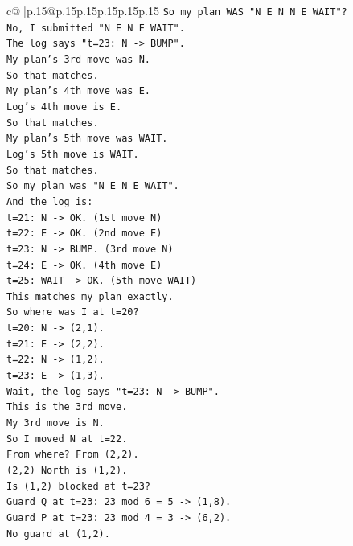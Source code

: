 \documentclass{article}
\begin{document}
{\begin{supertabular}{c@{$\;$}|p{.15\linewidth}@{}p{.15\linewidth}p{.15\linewidth}p{.15\linewidth}p{.15\linewidth}p{.15\linewidth}}
{{{\texttt{So my plan WAS "N E N N E WAIT"?} \\
\texttt{No, I submitted "N E N E WAIT".} \\
\texttt{The log says "t=23: N {-}> BUMP".} \\
\texttt{My plan's 3rd move was N.} \\
\texttt{So that matches.} \\
\texttt{My plan's 4th move was E.} \\
\texttt{Log's 4th move is E.} \\
\texttt{So that matches.} \\
\texttt{My plan's 5th move was WAIT.} \\
\texttt{Log's 5th move is WAIT.} \\
\texttt{So that matches.} \\
\texttt{So my plan was "N E N E WAIT".} \\
\texttt{And the log is:} \\
\texttt{t=21: N {-}> OK. (1st move N)} \\
\texttt{t=22: E {-}> OK. (2nd move E)} \\
\texttt{t=23: N {-}> BUMP. (3rd move N)} \\
\texttt{t=24: E {-}> OK. (4th move E)} \\
\texttt{t=25: WAIT {-}> OK. (5th move WAIT)} \\
\texttt{This matches my plan exactly.} \\
\texttt{So where was I at t=20?} \\
\texttt{t=20: N {-}> (2,1).} \\
\texttt{t=21: E {-}> (2,2).} \\
\texttt{t=22: N {-}> (1,2).} \\
\texttt{t=23: E {-}> (1,3).} \\
\texttt{Wait, the log says "t=23: N {-}> BUMP".} \\
\texttt{This is the 3rd move.} \\
\texttt{My 3rd move is N.} \\
\texttt{So I moved N at t=22.} \\
\texttt{From where? From (2,2).} \\
\texttt{(2,2) North is (1,2).} \\
\texttt{Is (1,2) blocked at t=23?} \\
\texttt{Guard Q at t=23: 23 mod 6 = 5 {-}> (1,8).} \\
\texttt{Guard P at t=23: 23 mod 4 = 3 {-}> (6,2).} \\
\texttt{No guard at (1,2).} \\
}}}
\end{supertabular}}
\end{document}
